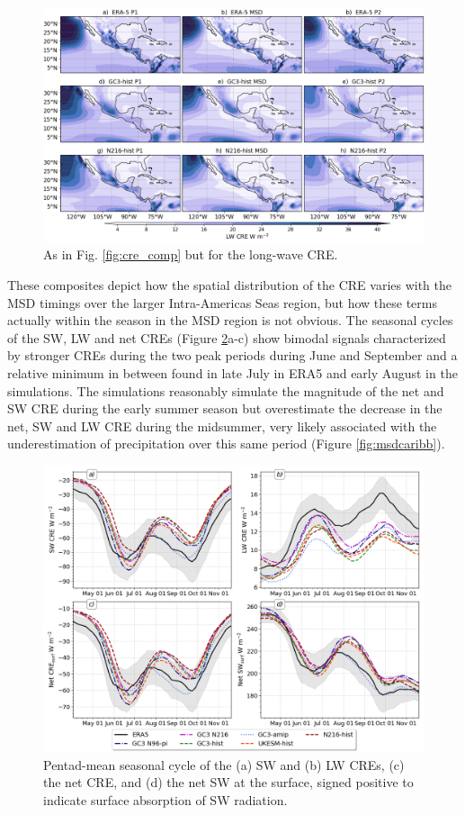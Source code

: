 \begin{figure}[t!]
\includegraphics[width=\linewidth]{figures/fig4_lwclim_3.png}
\caption{As in Fig. \ref{fig:cre_comp} but for the long-wave CRE.}
\label{fig:lw_comp}
\end{figure}

These composites depict how the spatial distribution of the CRE varies with the MSD timings over the larger Intra-Americas Seas region, but how these terms actually within the season in the MSD region is not obvious. The seasonal cycles of the SW, LW and net CREs (Figure \ref{fig:cre_seasonal}a-c) show bimodal signals characterized by stronger CREs during the two peak periods during June and September and a relative minimum in between found in late July in ERA5 and early August in the simulations. The simulations reasonably simulate the magnitude of the net and SW CRE during the early summer season but overestimate the decrease in the net, SW and LW CRE during the midsummer, very likely associated with the underestimation of precipitation over this same period (Figure \ref{fig:msdcaribb}).

\begin{figure}[t!]
\includegraphics[width=\linewidth]{figures/cre_index_seasonal.png}
\caption[Seasonal cycle of cloud-radiative effects]{Pentad-mean seasonal cycle of the (a) SW and (b)  LW CREs, (c) the net CRE, and (d) the net SW at the surface, signed positive to indicate surface absorption of SW radiation.}
\label{fig:cre_seasonal}
\end{figure}

